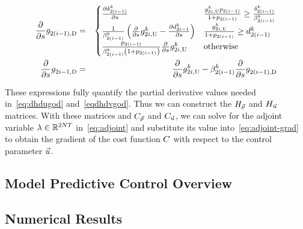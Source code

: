 \begin{eqnarray*}
\frac{\partial}{\partial s}g_{2\left(i-1\right),\text{D}}^{} & = & \begin{cases}
\frac{\partial\delta_{2\left(i-1\right)}^{k}}{\partial s} & \frac{g_{2i,\text{U}}^{k}p_{2(i-1)}}{1+p_{2(i-1)}}\ge\frac{\delta_{2\left(i-1\right)}^{k}}{\beta_{2\left(i-1\right)}^{k}}\\
\frac{1}{\beta_{2\left(i-1\right)}^{k}}\left(\frac{\partial}{\partial s}g_{2i,\text{U}}^{k}-\frac{\partial d_{2i-1}^{k}}{\partial s}\right) & \frac{g_{2i,\text{U}}^{k}}{1+p_{2(i-1)}}\ge d_{2\left(i-1\right)}^{k}\\
\frac{p_{2(i-1)}}{\beta_{2\left(i-1\right)}^{k}\left(1+p_{2(i-1)}\right)}\frac{\partial}{\partial s}g_{2i,\text{U}}^{k} & \text{otherwise}
\end{cases}\\
\frac{\partial}{\partial s}g_{2i-1,\text{D}}^{} & = & \frac{\partial}{\partial s}g_{2i,\text{U}}^{k}-\beta_{2\left(i-1\right)}^{k}\frac{\partial}{\partial s}g_{2\left(i-1\right),\text{D}}^{}
\end{eqnarray*}


These expressions fully quantify the partial derivative values needed
in~\eqref{eq:dhdugod} and~\eqref{eqdhdvgod}. Thus we can construct
the $H_{\vec{\rho}}$ and $H_{\vec{u}}$ matrices. With these matrices and $C_{\vec{\rho}}$ and
$C_{\vec{u}}$, we can solve for the adjoint variable $\lambda\in\mathbb{R}^{2NT}$
in~\eqref{eq:adjoint} and substitute its value into~\eqref{eq:adjoint-grad}
to obtain the gradient of the cost function $C$ with respect
to the control parameter $\vec{u}$.

\subsection{Model Predictive Control Overview}
\label{sec:model-predictive-control-overview-adjoint-section}



\subsection{Numerical Results}
\label{sec:numerical-results-adjoint}